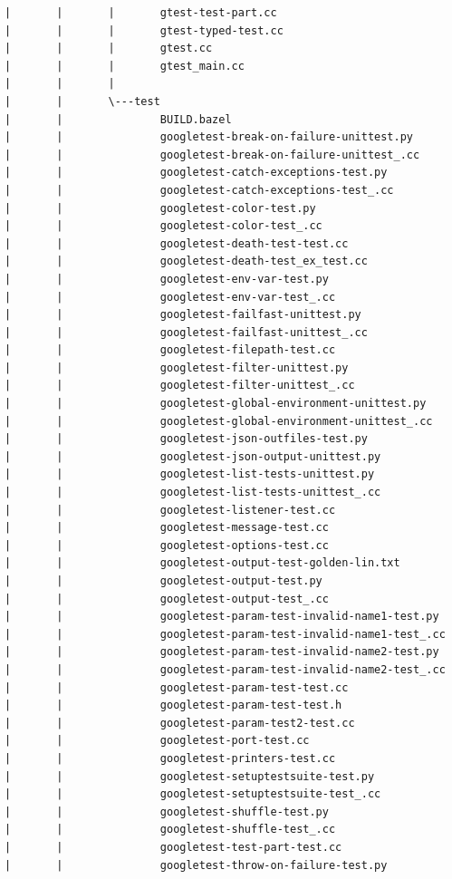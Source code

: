 \documentclass[12pt,a4paper]{article}
\begin{document}
\begin{verbatim}
|       |       |       gtest-test-part.cc
|       |       |       gtest-typed-test.cc
|       |       |       gtest.cc
|       |       |       gtest_main.cc
|       |       |       
|       |       \---test
|       |               BUILD.bazel
|       |               googletest-break-on-failure-unittest.py
|       |               googletest-break-on-failure-unittest_.cc
|       |               googletest-catch-exceptions-test.py
|       |               googletest-catch-exceptions-test_.cc
|       |               googletest-color-test.py
|       |               googletest-color-test_.cc
|       |               googletest-death-test-test.cc
|       |               googletest-death-test_ex_test.cc
|       |               googletest-env-var-test.py
|       |               googletest-env-var-test_.cc
|       |               googletest-failfast-unittest.py
|       |               googletest-failfast-unittest_.cc
|       |               googletest-filepath-test.cc
|       |               googletest-filter-unittest.py
|       |               googletest-filter-unittest_.cc
|       |               googletest-global-environment-unittest.py
|       |               googletest-global-environment-unittest_.cc
|       |               googletest-json-outfiles-test.py
|       |               googletest-json-output-unittest.py
|       |               googletest-list-tests-unittest.py
|       |               googletest-list-tests-unittest_.cc
|       |               googletest-listener-test.cc
|       |               googletest-message-test.cc
|       |               googletest-options-test.cc
|       |               googletest-output-test-golden-lin.txt
|       |               googletest-output-test.py
|       |               googletest-output-test_.cc
|       |               googletest-param-test-invalid-name1-test.py
|       |               googletest-param-test-invalid-name1-test_.cc
|       |               googletest-param-test-invalid-name2-test.py
|       |               googletest-param-test-invalid-name2-test_.cc
|       |               googletest-param-test-test.cc
|       |               googletest-param-test-test.h
|       |               googletest-param-test2-test.cc
|       |               googletest-port-test.cc
|       |               googletest-printers-test.cc
|       |               googletest-setuptestsuite-test.py
|       |               googletest-setuptestsuite-test_.cc
|       |               googletest-shuffle-test.py
|       |               googletest-shuffle-test_.cc
|       |               googletest-test-part-test.cc
|       |               googletest-throw-on-failure-test.py

\end{verbatim}
\end{document}
